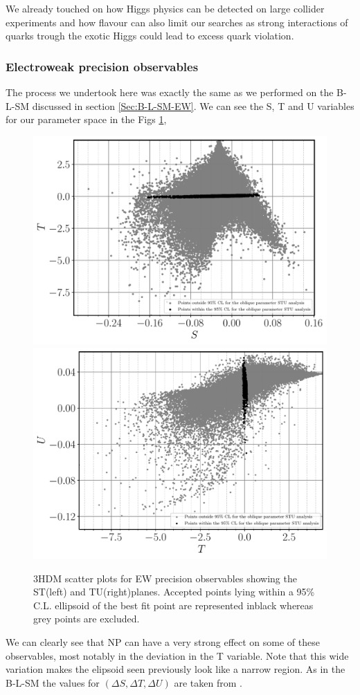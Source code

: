 We already touched on how Higgs physics can be detected on large collider experiments and how flavour can also limit our searches as strong interactions of quarks trough the exotic Higgs could lead to excess quark violation. %
%
\subsubsection{Electroweak precision observables}

The process we undertook here was exactly the same as we performed on the B-L-SM discussed in section \ref{Sec:B-L-SM-EW}. 
%
We can see the S, T and U variables for our parameter space in the Figs \ref{Fig:3HDM_STU}, 
%
\begin{figure}[H]
	\centering
	\includegraphics[width=.49\textwidth]{Images/3HDM/EW/EW_S_T_black.pdf}	
	\includegraphics[width=.49\textwidth]{Images/3HDM/EW/EW_T_U_black.pdf}
	\caption{3HDM scatter plots for EW  precision  observables  showing  the ST(left)  and TU(right)planes.  Accepted points lying within a 95\% C.L. ellipsoid of the best fit point are represented inblack whereas grey points are excluded.}
	\label{Fig:3HDM_STU}
\end{figure}
%
We can clearly see that NP can have a very strong effect on some of these observables, most notably in the deviation in the T variable.
%
Note that this wide variation makes the elipsoid seen previously look like a narrow region. 
%
As in the B-L-SM the values for $(\Delta S , \Delta T , \Delta U )$ are taken from \cite{Baak_2012}.

